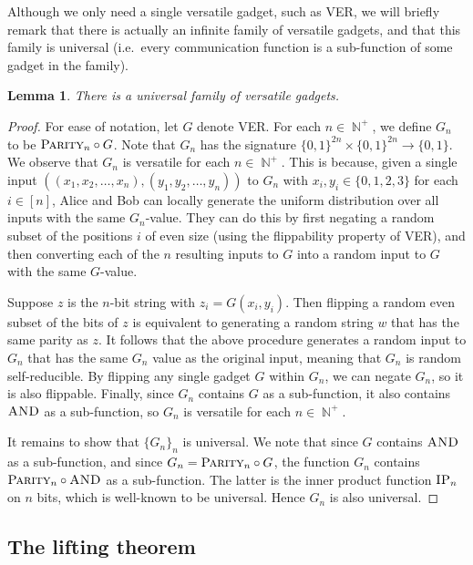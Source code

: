 \documentclass[10pt,a4paper]{article}
\newtheorem{lemma}[theorem]{Lemma}
\theoremstyle{definition}
\newcommand{\B}{\{0,1\}}
\renewcommand{\>}{\rangle}
\newcommand{\<}{\langle}
\DeclareMathOperator{\bN}{\mathbb{N}}
\newcommand{\AND}{\textsc{AND}}
\newcommand{\PARITY}{\textsc{Parity}}
\newcommand{\IP}{\textsc{IP}}
\begin{document}
Although we only need a single versatile gadget,
such as \textsc{VER}, we will briefly remark that there is
actually an infinite family of versatile gadgets, and that
this family is universal (i.e.\ every communication function
is a sub-function of some gadget in the family).

\begin{lemma}
There is a universal family of versatile gadgets.
\end{lemma}

\begin{proof}
For ease of notation, let $G$ denote \textsc{VER}.
For each $n\in\bN^+$, we define $G_{n}$ to be
$\PARITY_n\circ G$. Note that $G_{n}$ has the signature
$\B^{2n}\times\B^{2n}\to\B$. We observe that $G_{n}$
is versatile for each $n\in\bN^{+}$. This is because,
given a single input $((x_1,x_2,\dots,x_n),(y_1,y_2,\dots,y_n))$
to $G_{n}$ with $x_i,y_i\in\{0,1,2,3\}$ for each $i\in[n]$,
Alice and Bob can locally generate the uniform
distribution over all inputs with the same $G_{n}$-value.
They can do this by first negating a random subset of the
positions $i$ of even size
(using the flippability property of \textsc{VER}),
and then converting each of the $n$ resulting inputs to $G$
into a random input to $G$ with the same $G$-value.

Suppose $z$ is the $n$-bit string with $z_i=G(x_i,y_i)$.
Then flipping a random even subset of the bits of $z$
is equivalent to generating a random string $w$ that has
the same parity as $z$. It follows that the above procedure
generates a random input to $G_{n}$ that has the same $G_{n}$
value as the original input, meaning that $G_{n}$
is random self-reducible. By flipping any single gadget
$G$ within $G_{n}$, we can negate $G_n$, so it is also
flippable. Finally, since $G_n$ contains $G$ as a sub-function,
it also contains $\AND$ as a sub-function, so $G_n$
is versatile for each $n\in\bN^{+}$.

It remains to show that $\{G_n\}_n$ is universal.
We note that since $G$ contains $\AND$ as a sub-function,
and since $G_n=\PARITY_n\circ G$, the function $G_n$
contains $\PARITY_n\circ\AND$ as a sub-function. The latter
is the inner product function $\IP_n$ on $n$ bits,
which is well-known to be universal. Hence $G_n$ is also
universal.
\end{proof}


\subsection{The lifting theorem}
\end{document}
